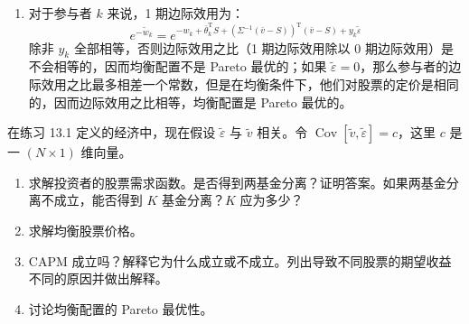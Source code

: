 \begin{solution}
\begin{enumerate}[label=(\alph*)]
    \item 对于参与者 $k$ 来说，1 期边际效用为：
    \[
        e^{-\tilde{w}_{k}}=e^{-w_{k}+\bar{\theta}_{k}^{\mathrm{T}}S+(\Sigma^{-1}(\bar{v}-S))^{\mathrm{T}}(\bar{v}-S)+y_{k}\tilde{\varepsilon}}
    \]
    除非 $y_{k}$ 全部相等，否则边际效用之比（1 期边际效用除以 0 期边际效用）是不会相等的，因而均衡配置不是 Pareto 最优的；如果 $\tilde{\varepsilon}=0$，那么参与者的边际效用之比最多相差一个常数，但是在均衡条件下，他们对股票的定价是相同的，因而边际效用之比相等，均衡配置是 Pareto 最优的。
\end{enumerate}
\end{solution}

\begin{problem}
 在练习 13.1 定义的经济中，现在假设 $\tilde{\varepsilon}$ 与 $\tilde{v}$ 相关。令 $\operatorname{Cov}[\tilde{v},\tilde{\varepsilon}]=c$，这里 $c$ 是一 $(N\times 1)$ 维向量。
\begin{enumerate}[label=(\alph*)]
    \item 求解投资者的股票需求函数。是否得到两基金分离？证明答案。如果两基金分离不成立，能否得到 $K$ 基金分离？$K$ 应为多少？
    \item 求解均衡股票价格。
    \item CAPM 成立吗？解释它为什么成立或不成立。列出导致不同股票的期望收益不同的原因并做出解释。
    \item 讨论均衡配置的 Pareto 最优性。
\end{enumerate}
\end{problem}
